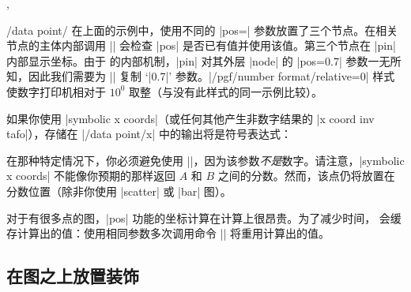 {\begin{commandlist}{\pgfplotspointplotattime,\pgfplotspointplotattime{}}
\begin{pgfplotsxykeylist}{/data point/\x}
        在上面的示例中，使用不同的 |pos=| 参数放置了三个节点。在相关节点的主体内部调用 |\pgfplotspointplotattime| 会检查 |pos| 是否已有值并使用该值。第三个节点在 |pin| 内部显示坐标。由于 \tikzname 的内部机制，|pin| 对其外层 |node| 的 |pos=0.7| 参数一无所知，因此我们需要为 || 复制 `|0.7|' 参数。|/pgf/number format/relative=0| 样式使数字打印机相对于 $10^0$ 取整（与没有此样式的同一示例比较）。

        如果你使用 |symbolic x coords|（或任何其他产生非数字结果的 |x coord inv tafo|），存储在 |/data point/x| 中的输出将是符号表达式：
\begin{codeexample}[]
\end{codeexample}
        \noindent 在那种特定情况下，你必须避免使用 |\pgfmathprintnumber|，因为该参数\emph{不是}数字。请注意，|symbolic x coords| 不能像你预期的那样返回 $A$ 和 $B$ 之间的分数。然而，该点仍将放置在分数位置（除非你使用 |scatter| 或 |bar| 图）。

        对于有很多点的图，|pos| 功能的坐标计算在计算上很昂贵。为了减少时间，\PGFPlots{} 会缓存计算出的值：使用相同参数多次调用命令 |\pgfplotspointplotattime| 将重用计算出的值。
    \end{pgfplotsxykeylist}
\end{commandlist}

}


\subsection{在图之上放置装饰}


